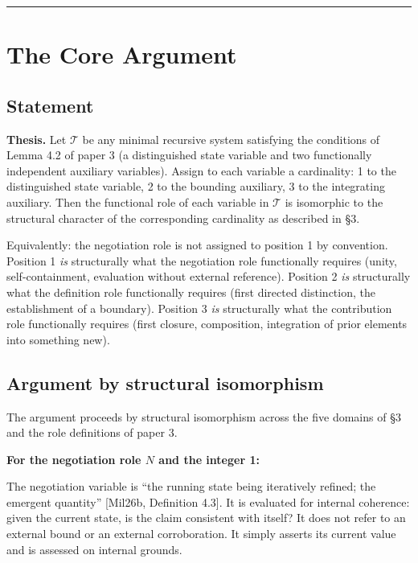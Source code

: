 \documentclass[12pt]{article}
\begin{document}
\begin{center}\rule{0.5\linewidth}{0.5pt}\end{center}

\section{The Core Argument}\label{the-core-argument}

\subsection{Statement}\label{statement}

\textbf{Thesis.} Let \(\mathcal{T}\) be any minimal recursive system
satisfying the conditions of Lemma 4.2 of paper 3 (a distinguished state
variable and two functionally independent auxiliary variables). Assign
to each variable a cardinality: 1 to the distinguished state variable, 2
to the bounding auxiliary, 3 to the integrating auxiliary. Then the
functional role of each variable in \(\mathcal{T}\) is isomorphic to the
structural character of the corresponding cardinality as described in
§3.

Equivalently: the negotiation role is not assigned to position 1 by
convention. Position 1 \emph{is} structurally what the negotiation role
functionally requires (unity, self-containment, evaluation without
external reference). Position 2 \emph{is} structurally what the
definition role functionally requires (first directed distinction, the
establishment of a boundary). Position 3 \emph{is} structurally what the
contribution role functionally requires (first closure, composition,
integration of prior elements into something new).

\subsection{Argument by structural isomorphism}\label{argument-by-structural-isomorphism}

The argument proceeds by structural isomorphism across the five domains
of §3 and the role definitions of paper 3.

\textbf{For the negotiation role \(N\) and the integer 1:}

The negotiation variable is ``the running state being iteratively
refined; the emergent quantity'' {[}Mil26b, Definition 4.3{]}. It is
evaluated for internal coherence: given the current state, is the claim
consistent with itself? It does not refer to an external bound or an
external corroboration. It simply asserts its current value and is
assessed on internal grounds.
\end{document}
